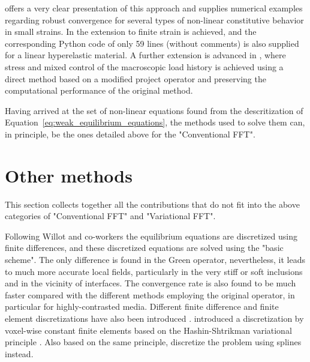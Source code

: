 \cite{zeman_finite_2017} offers a very clear presentation of this approach and supplies numerical examples regarding robust convergence for several types of non-linear constitutive behavior in small strains.
In \cite{de_geus_finite_2017} the extension to finite strain is achieved, and the corresponding Python code of only 59 lines (without comments) is also supplied for a linear hyperelastic material.
A further extension is advanced in \cite{lucarini_algorithm_2019}, where stress and mixed control of the macroscopic load history is achieved using a direct method based on a modified project operator and preserving the computational performance of the original method.

Having arrived at the set of non-linear equations found from the descritization of Equation~\eqref{eq:weak_equilibrium_equations}, the methods used to solve them can, in principle, be the ones detailed above for the "Conventional FFT".

\section{Other methods}

This section collects together all the contributions that do not fit into the above categories of "Conventional FFT" and "Variational FFT".


Following Willot and co-workers \citep{willot_fast_2008, willot_fourier-based_2014, willot_fourier-based_2015} the equilibrium equations are discretized using finite differences, and these discretized equations are solved using the "basic scheme".
The only difference is found in the Green operator, nevertheless, it leads to much more accurate local fields, particularly in the very stiff or soft inclusions and in the vicinity of interfaces.
The convergence rate is also found to be much faster compared with the different methods employing the original operator, in particular for highly-contrasted media.
Different finite difference and finite element discretizations have also been introduced \citep{schneider_computational_2016, schneider_fft-based_2017, djaka_field_2017, eloh_development_2019}.
\cite{brisard_fft-based_2010, brisard_combining_2012} introduced a discretization by voxel-wise constant finite elements based on the Hashin-Shtrikman variational principle \citep{hashin_variational_1962}.
Also based on the same principle, \cite{tu_implementation_2020} discretize the problem using splines instead.

